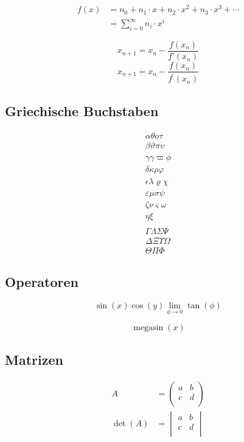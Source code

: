 \documentclass[fleqn]%
{scrartcl}
\DeclareMathOperator{\myop}{megasin}
\begin{document}
\begin{align*}
	f(x) &= n_0 + n_1 \cdot x + n_2 \cdot x^2 + n_3 \cdot x^3 + \cdots \\
	     &= \sum_{i=0}^\infty n_i \cdot x^i
\end{align*}

\[ x_{n+1} = x_n - \frac{f(x_n)}{f’(x_n)} \]
\[ x_{n+1} = x_n - \frac{f(x_n)}{f^\prime (x_n)} \]




\subsection{Griechische Buchstaben}

\begin{align*}
\alpha        \theta        o           \tau         \\
\beta         \vartheta    \pi          \upsilon     \\
\gamma        \gamma       \varpi       \phi         \\
\delta        \kappa       \rho         \varphi      \\
\epsilon      \lambda      \varrho      \chi         \\
\varepsilon   \mu          \sigma       \psi         \\
\zeta         \nu          \varsigma    \omega       \\
\eta          \xi                                    \\
                                                     \\
\Gamma        \Lambda      \Sigma       \Psi         \\
\Delta        \Xi          \Upsilon     \Omega       \\
\Theta        \Pi          \Phi
\end{align*}



\subsection{Operatoren}

\begin{equation}
	\sin(x)
	\cos(y)
	\lim_{\phi\rightarrow 0} \tan(\phi)
\end{equation}

\begin{equation}
	\myop(x)
\end{equation}



\subsection{Matrizen}

\begin{align}
	A &= 
 		\begin{pmatrix}
 			a & b \\
	 		c & d \\
 		\end{pmatrix} \\
	\det(A) &= 
		\begin{vmatrix}
 			a & b \\
	 		c & d \\
 		\end{vmatrix}
\end{align}
\end{document}
